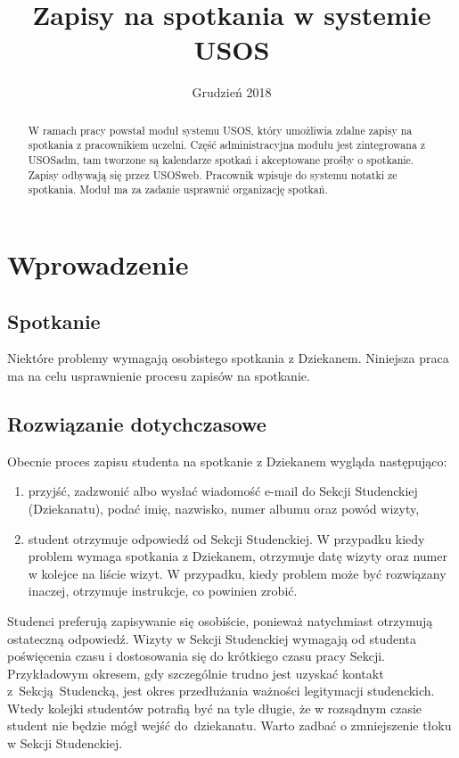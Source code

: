 \documentclass[licencjacka]{pracamgr}
\title{Zapisy na spotkania w systemie USOS}
\date{Grudzień 2018}
\begin{document}
\maketitle

\begin{abstract}
  W ramach pracy powstał moduł systemu USOS, który umożliwia zdalne zapisy na spotkania z pracownikiem uczelni. Część administracyjna modułu jest zintegrowana z USOSadm, tam tworzone są kalendarze spotkań i akceptowane prośby o spotkanie. Zapisy odbywają się przez USOSweb. Pracownik wpisuje do systemu notatki ze spotkania. Moduł ma za zadanie usprawnić organizację spotkań.
\end{abstract}

\tableofcontents

\chapter{Wprowadzenie} \label{chap:wpr}
\section{Spotkanie}
Niektóre problemy wymagają osobistego spotkania z Dziekanem. Niniejsza praca ma na celu usprawnienie procesu zapisów na spotkanie.
\section{Rozwiązanie dotychczasowe}
Obecnie proces zapisu studenta na spotkanie z Dziekanem wygląda następująco:
\begin{enumerate}
\item przyjść, zadzwonić albo wysłać wiadomość e-mail do Sekcji Studenckiej (Dziekanatu), podać imię, nazwisko, numer albumu oraz powód wizyty,
\item student otrzymuje odpowiedź od Sekcji Studenckiej. W przypadku kiedy problem wymaga spotkania z Dziekanem, otrzymuje datę wizyty oraz numer w kolejce na liście wizyt. W przypadku, kiedy problem może być rozwiązany inaczej, otrzymuje instrukcje, co powinien zrobić.
\end{enumerate}
Studenci preferują zapisywanie się osobiście, ponieważ natychmiast otrzymują ostateczną odpowiedź. Wizyty w Sekcji Studenckiej wymagają od studenta poświęcenia czasu i dostosowania się do krótkiego czasu pracy Sekcji. Przykładowym okresem, gdy szczególnie trudno jest uzyskać kontakt z~Sekcją~Studencką, jest okres przedłużania ważności legitymacji studenckich. Wtedy kolejki studentów potrafią być na tyle długie, że w rozsądnym czasie student nie będzie mógł wejść do~dziekanatu. Warto zadbać o zmniejszenie tłoku w Sekcji Studenckiej.
\end{document}
